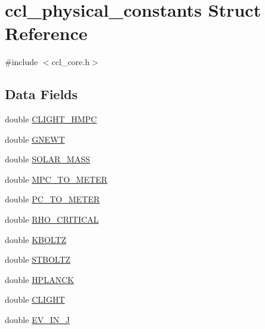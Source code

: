 \hypertarget{structccl__physical__constants}{}\section{ccl\+\_\+physical\+\_\+constants Struct Reference}
\label{structccl__physical__constants}


{\ttfamily \#include $<$ccl\+\_\+core.\+h$>$}

\subsection*{Data Fields}
\begin{DoxyCompactItemize}
\item 
double \mbox{\hyperlink{structccl__physical__constants_ad3720957ff4700dc076030aafb2c6f22}{C\+L\+I\+G\+H\+T\+\_\+\+H\+M\+PC}}
\item 
double \mbox{\hyperlink{structccl__physical__constants_ab084addac340a33bd51797cabc440f83}{G\+N\+E\+WT}}
\item 
double \mbox{\hyperlink{structccl__physical__constants_a9e82da2bed7910922196d428e9d19ade}{S\+O\+L\+A\+R\+\_\+\+M\+A\+SS}}
\item 
double \mbox{\hyperlink{structccl__physical__constants_a56a2796740bd82659582fb73cd877bf8}{M\+P\+C\+\_\+\+T\+O\+\_\+\+M\+E\+T\+ER}}
\item 
double \mbox{\hyperlink{structccl__physical__constants_a3fa10b26f8437042bb874bcc7d3d950c}{P\+C\+\_\+\+T\+O\+\_\+\+M\+E\+T\+ER}}
\item 
double \mbox{\hyperlink{structccl__physical__constants_a6a62964ad0e321013bcda1b66be6eca5}{R\+H\+O\+\_\+\+C\+R\+I\+T\+I\+C\+AL}}
\item 
double \mbox{\hyperlink{structccl__physical__constants_aa3595b23d409d96fb37fa4d233288bc3}{K\+B\+O\+L\+TZ}}
\item 
double \mbox{\hyperlink{structccl__physical__constants_a3c5543d40090d72be6bdf246d9749577}{S\+T\+B\+O\+L\+TZ}}
\item 
double \mbox{\hyperlink{structccl__physical__constants_a51240deeb4abc83d445f948df465618f}{H\+P\+L\+A\+N\+CK}}
\item 
double \mbox{\hyperlink{structccl__physical__constants_a06e87731251b94440d38270a513ebac9}{C\+L\+I\+G\+HT}}
\item 
double \mbox{\hyperlink{structccl__physical__constants_a532ea68d56118334483f5465d6860f02}{E\+V\+\_\+\+I\+N\+\_\+J}}
\item 

\end{DoxyCompactItemize}
